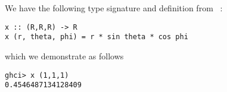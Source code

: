 
We have the following type signature and definition from \
:
\begin{verbatim}
x :: (R,R,R) -> R
x (r, theta, phi) = r * sin theta * cos phi
\end{verbatim}
which we demonstrate as follows
\begin{verbatim}
ghci> x (1,1,1)
0.4546487134128409
\end{verbatim}
